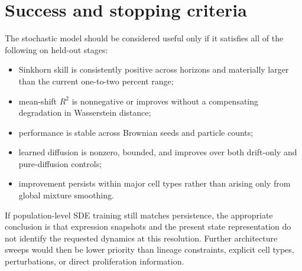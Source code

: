 \documentclass[11pt]{article}
\begin{document}
\section{Success and stopping criteria}

The stochastic model should be considered useful only if it satisfies all of
the following on held-out stages:
\begin{itemize}
  \item Sinkhorn skill is consistently positive across horizons and materially
        larger than the current one-to-two percent range;
  \item mean-shift $R^2$ is nonnegative or improves without a compensating
        degradation in Wasserstein distance;
  \item performance is stable across Brownian seeds and particle counts;
  \item learned diffusion is nonzero, bounded, and improves over both
        drift-only and pure-diffusion controls;
  \item improvement persists within major cell types rather than arising only
        from global mixture smoothing.
\end{itemize}

If population-level SDE training still matches persistence, the appropriate
conclusion is that expression snapshots and the present state representation do
not identify the requested dynamics at this resolution. Further architecture
sweeps would then be lower priority than lineage constraints, explicit cell
types, perturbations, or direct proliferation information.
\end{document}
